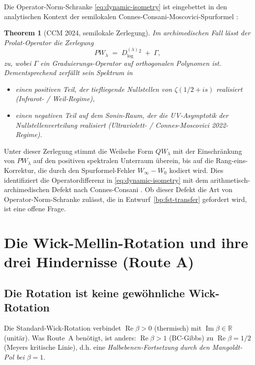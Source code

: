 \documentclass[11pt,a4paper]{article}
\theoremstyle{plain}
\newtheorem{theorem}{Theorem}[section]
\theoremstyle{definition}
\newcommand{\R}{\mathbb{R}}
\renewcommand{\Re}{\operatorname{Re}}
\renewcommand{\Im}{\operatorname{Im}}
\begin{document}
Die Operator-Norm-Schranke \eqref{eq:dynamic-isometry} ist eingebettet in den
analytischen Kontext der semilokalen Connes-Consani-Moscovici-Spurformel
\cite{ConnesConsaniMoscovici2024}:

\begin{theorem}[CCM 2024, semilokale Zerlegung]\label{thm:ccm-semilocal}
Im archimedischen Fall lässt der Prolat-Operator die Zerlegung
\[
  PW_\lambda \;=\; D^{(\lambda)}_{\log}{}^2 \;+\; \Gamma,
\]
zu, wobei $\Gamma$ ein Graduierungs-Operator auf orthogonalen Polynomen ist.
Dementsprechend zerfällt sein Spektrum in
\begin{itemize}[leftmargin=*]
\item einen \emph{positiven Teil}, der tiefliegende Nullstellen von
  $\zeta(1/2+is)$ realisiert (Infrarot- / Weil-Regime),
\item einen \emph{negativen Teil} auf dem Sonin-Raum, der die UV-Asymptotik
  der Nullstellenverteilung realisiert (Ultraviolett- / Connes-Moscovici 2022-Regime).
\end{itemize}
\end{theorem}

Unter dieser Zerlegung stimmt die Weilsche Form $QW_\lambda$ mit der Einschränkung
von $PW_\lambda$ auf den positiven spektralen Unterraum überein, bis auf die
Rang-eins-Korrektur, die durch den Spurformel-Fehler $W_\infty - W_0$ kodiert wird.
Dies identifiziert die Operatordifferenz in \eqref{eq:dynamic-isometry} mit dem
arithmetisch-archimedischen Defekt nach Connes-Consani \cite{ConnesConsaniWeilPositivity2020}.
Ob dieser Defekt die Art von Operator-Norm-Schranke zulässt, die in
Entwurf~\ref{bp:fst-transfer} gefordert wird, ist eine offene Frage.

\section{Die Wick-Mellin-Rotation und ihre drei Hindernisse (Route A)}
\label{sec:wick-mellin-obstacles}

\subsection{Die Rotation ist keine gewöhnliche Wick-Rotation}

Die Standard-Wick-Rotation verbindet $\Re\beta > 0$ (thermisch) mit
$\Im\beta \in \R$ (unitär). Was Route~A benötigt, ist anders:
$\Re\beta > 1$ (BC-Gibbs) zu $\Re\beta = 1/2$ (Meyers kritische Linie),
d.h. eine \emph{Halbebenen-Fortsetzung durch den Mangoldt-Pol bei
$\beta = 1$}.
\end{document}

